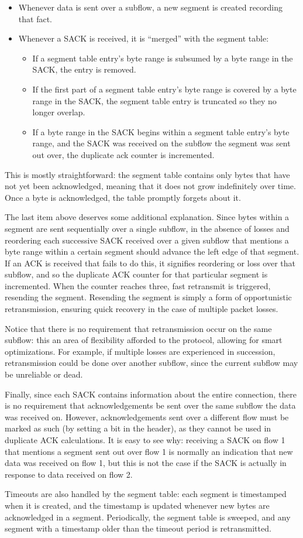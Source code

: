 \begin{itemize}
  \item Whenever data is sent over a subflow, a new segment is created recording that fact.
  \item Whenever a SACK is received, it is ``merged'' with the segment table:
  \begin{itemize}
    \item If a segment table entry's byte range is subsumed by a byte range in the SACK, the entry is removed.
    \item If the first part of a segment table entry's byte range is covered by a byte range in the SACK, the segment table entry is truncated so they no longer overlap.
    \item If a byte range in the SACK begins within a segment table entry's byte range, and the SACK was received on the subflow the segment was sent out over, the duplicate ack counter is incremented.
  \end{itemize}
\end{itemize}

This is mostly straightforward: the segment table contains only bytes that have not yet been acknowledged, meaning that it does not grow indefinitely over time. Once a byte is acknowledged, the table promptly forgets about it.

The last item above deserves some additional explanation. Since bytes within a segment are sent sequentially over a single subflow, in the absence of losses and reordering each successive SACK received over a given subflow that mentions a byte range within a certain segment should advance the left edge of that segment. If an ACK is received that fails to do this, it signifies reordering or loss over that subflow, and so the duplicate ACK counter for that particular segment is incremented. When the counter reaches three, fast retransmit is triggered, resending the segment. Resending the segment is simply a form of opportunistic retransmission, ensuring quick recovery in the case of multiple packet losses.

Notice that there is no requirement that retransmission occur on the same subflow: this an area of flexibility afforded to the protocol, allowing for smart optimizations. For example, if multiple losses are experienced in succession, retransmission could be done over another subflow, since the current subflow may be unreliable or dead.

Finally, since each SACK contains information about the entire connection, there is no requirement that acknowledgements be sent over the same subflow the data was received on. However, acknowledgements sent over a different flow must be marked as such (by setting a bit in the header), as they cannot be used in duplicate ACK calculations. It is easy to see why: receiving a SACK on flow 1 that mentions a segment sent out over flow 1 is normally an indication that new data was received on flow 1, but this is not the case if the SACK is actually in response to data received on flow 2.

Timeouts are also handled by the segment table: each segment is timestamped when it is created, and the timestamp is updated whenever new bytes are acknowledged in a segment. Periodically, the segment table is sweeped, and any segment with a timestamp older than the timeout period is retransmitted.